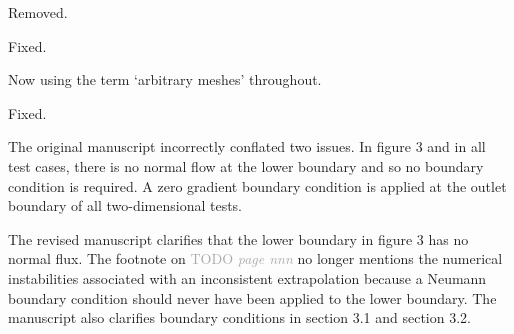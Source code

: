 \documentclass[times]{elsarticle}
\newcommand{\TODO}[1]{\textcolor{darkgray}{TODO \textit{#1}}}
\begin{document}
\begin{quotation}
\begin{comment}
\item  p.3, paragraph after Eq. (2b): if there is no specific need, I
    sugggest to remove "zero-dimensional".
\end{comment}
\end{quotation}
Removed.

\begin{quotation}
\begin{comment}
\item  p.4, last paragraph in Section 2.0: "methods are described next"
    instead of "methods described next".
\end{comment}
\end{quotation}
Fixed.

\begin{quotation}
\begin{comment}
\item  p.5, first paragraph: Is it "arbitrary meshes" or "arbitrary
    structured meshes"?
\end{comment}
\end{quotation}
Now using the term `arbitrary meshes' throughout.

\begin{quotation}
\begin{comment}
\item  p.5, last paragraph of Section 2.1.1.: "dirichlet" should be
    upper case "Dirichlet".
\end{comment}
\end{quotation}
Fixed.

\begin{quotation}
\begin{comment}
\item p.7, caption of Fig. 3, last sentence: It is stated that a
    von Neumann boundary condition is assumed. However, the
    footnote on p.5 says that Neumann BCs are excluded from the
    set of stencil boundary faces?
\end{comment}
\end{quotation}
The original manuscript incorrectly conflated two issues.  In figure 3 and in all test cases, there is no normal flow at the lower boundary and so no boundary condition is required.  A zero gradient boundary condition is applied at the outlet boundary of all two-dimensional tests.

The revised manuscript clarifies that the lower boundary in figure 3 has no normal flux.  The footnote on \TODO{page nnn} no longer mentions the numerical instabilities associated with an inconsistent extrapolation because a Neumann boundary condition should never have been applied to the lower boundary.  The manuscript also clarifies boundary conditions in section 3.1 and section 3.2.
\end{document}
